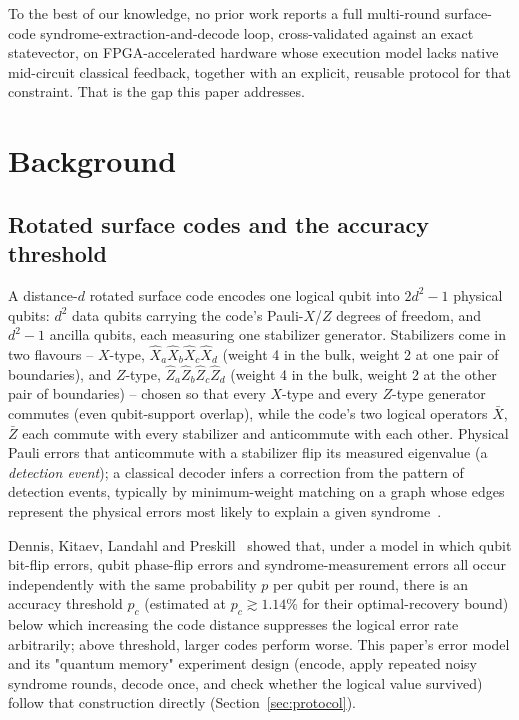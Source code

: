 \documentclass[pdflatex,sn-mathphys,Numbered]{sn-jnl}
\begin{document}
To the best of our knowledge, no prior work reports a full multi-round surface-code syndrome-extraction-and-decode loop, cross-validated against an exact statevector, on FPGA-accelerated hardware whose execution model lacks native mid-circuit classical feedback, together with an explicit, reusable protocol for that constraint. That is the gap this paper addresses.

\section{Background}\label{sec:background}

\subsection{Rotated surface codes and the accuracy threshold}\label{sec:background-surface}

A distance-$d$ rotated surface code encodes one logical qubit into $2d^{2}-1$ physical qubits: $d^{2}$ data qubits carrying the code's Pauli-$X$/$Z$ degrees of freedom, and $d^{2}-1$ ancilla qubits, each measuring one stabilizer generator. Stabilizers come in two flavours -- $X$-type, $\hat X_{a}\hat X_{b}\hat X_{c}\hat X_{d}$ (weight 4 in the bulk, weight 2 at one pair of boundaries), and $Z$-type, $\hat Z_{a}\hat Z_{b}\hat Z_{c}\hat Z_{d}$ (weight 4 in the bulk, weight 2 at the other pair of boundaries) -- chosen so that every $X$-type and every $Z$-type generator commutes (even qubit-support overlap), while the code's two logical operators $\bar X$, $\bar Z$ each commute with every stabilizer and anticommute with each other. Physical Pauli errors that anticommute with a stabilizer flip its measured eigenvalue (a \emph{detection event}); a classical decoder infers a correction from the pattern of detection events, typically by minimum-weight matching on a graph whose edges represent the physical errors most likely to explain a given syndrome~\cite{dennis2002,fowler2012}.

Dennis, Kitaev, Landahl and Preskill~\cite{dennis2002} showed that, under a model in which qubit bit-flip errors, qubit phase-flip errors and syndrome-measurement errors all occur independently with the same probability $p$ per qubit per round, there is an accuracy threshold $p_{c}$ (estimated at $p_c \gtrsim 1.14\%$ for their optimal-recovery bound) below which increasing the code distance suppresses the logical error rate arbitrarily; above threshold, larger codes perform worse. This paper's error model and its "quantum memory" experiment design (encode, apply repeated noisy syndrome rounds, decode once, and check whether the logical value survived) follow that construction directly (Section~\ref{sec:protocol}).
\end{document}

